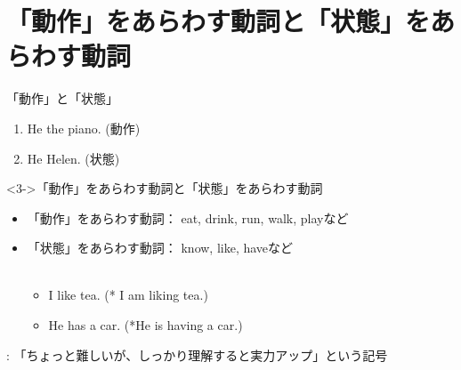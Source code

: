 \documentclass[aspectratio=169,xcolor={dvipsnames,table}]{beamer}
\begin{document}
\section{「動作」をあらわす動詞と「状態」をあらわす動詞}
\begin{frame}[plain]{「動作」と「状態」}
\large
 \begin{enumerate}
  \item<1-> He  the piano. (動作)\hspace{20pt}
  \item<2-> He  Helen. (状態)\hspace{34pt}\\
\hfill{}
 \end{enumerate}

\begin{block}<3->{「動作」をあらわす動詞と「状態」をあらわす動詞}\small
\begin{itemize}[square]
 \item<3-> 「動作」をあらわす動詞： eat, drink, run, walk, playなど
 \item<3-> 「状態」をあらわす動詞： know, like, haveなど\\
\hfill{}\\[5pt]
     \hfill\begin{minipage}{.5\textwidth}
      \begin{itemize}[circle]\setlength{\itemsep}{-2pt}
       \item<7-> I like tea. (* I am liking tea.)
       \item<8-> He has a car. (*He is having a car.)
      \end{itemize}
      \end{minipage}
\end{itemize}
\end{block}
\hfill{\scriptsize \dbend{}: 「ちょっと難しいが、しっかり理解すると実力アップ」という記号}
\end{frame}
\end{document}
